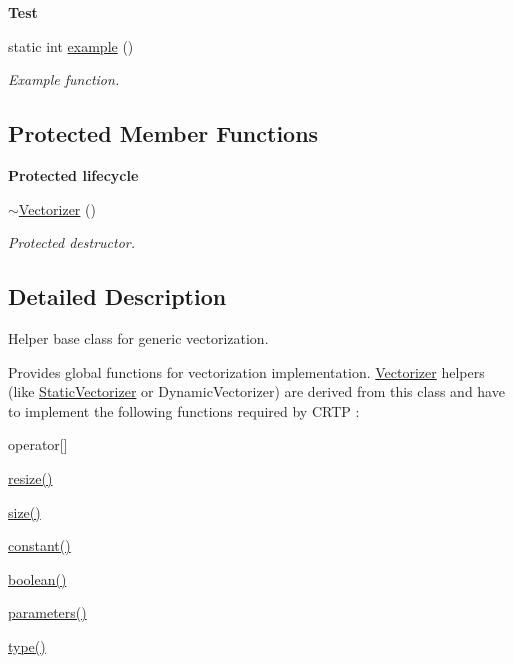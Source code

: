 \begin{Indent}{\bf Test}\par
\begin{DoxyCompactItemize}
\item 
static int \hyperlink{classmagrathea_1_1Vectorizer_a302758cf072c56ea44519a41c2b70171}{example} ()
\begin{DoxyCompactList}\small\item\em Example function. \end{DoxyCompactList}\end{DoxyCompactItemize}
\end{Indent}
\subsection*{Protected Member Functions}
\begin{Indent}{\bf Protected lifecycle}\par
\begin{DoxyCompactItemize}
\item 
\hyperlink{classmagrathea_1_1Vectorizer_ab42248d231900ce89e17405a9e751535}{$\sim$\-Vectorizer} ()
\begin{DoxyCompactList}\small\item\em Protected destructor. \end{DoxyCompactList}\end{DoxyCompactItemize}
\end{Indent}


\subsection{Detailed Description}
Helper base class for generic vectorization. 

Provides global functions for vectorization implementation. \hyperlink{classmagrathea_1_1Vectorizer}{Vectorizer} helpers (like \hyperlink{classmagrathea_1_1StaticVectorizer}{Static\-Vectorizer} or Dynamic\-Vectorizer) are derived from this class and have to implement the following functions required by C\-R\-T\-P \-: 
\begin{DoxyItemize}
\item {\ttfamily operator\mbox{[}\mbox{]}} 
\item {\ttfamily \hyperlink{classmagrathea_1_1Vectorizer_afe3c5369c91276766e0197fa33ae4951}{resize()}} 
\item {\ttfamily \hyperlink{classmagrathea_1_1Vectorizer_a3b54f2b5f17c2054f99e03c7c4614558}{size()}} 
\item {\ttfamily \hyperlink{classmagrathea_1_1Vectorizer_a2e30cc7971bfbcf7b21f993b56c0644e}{constant()}} 
\item {\ttfamily \hyperlink{classmagrathea_1_1Vectorizer_ab5100fafcacd2c835380dbe0403422ec}{boolean()}} 
\item {\ttfamily \hyperlink{classmagrathea_1_1Vectorizer_a7815b5c9e9ff56064306e7d07dae5bb7}{parameters()}} 
\item {\ttfamily \hyperlink{classmagrathea_1_1Vectorizer_af46ebf417fa856107cb9b84db9939f76}{type()}} 
\end{DoxyItemize}

